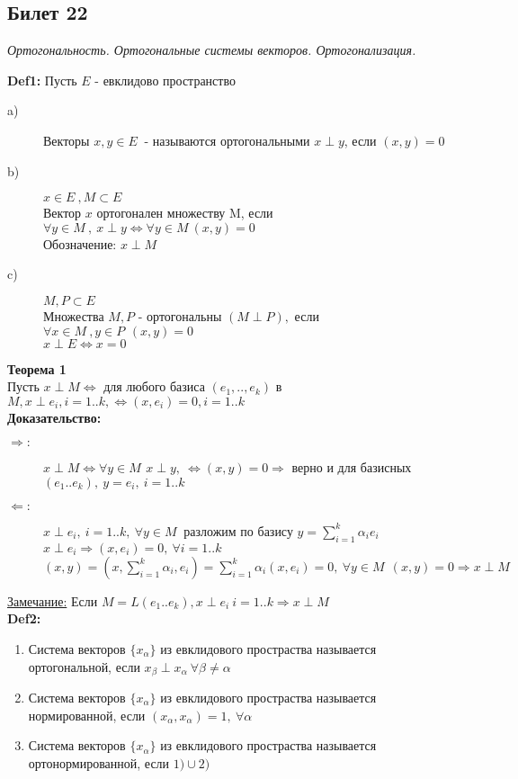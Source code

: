 \subsection{Билет 22}


\textit{Ортогональность. Ортогональные системы векторов. Ортогонализация.}


\textbf{Def1: } Пусть $E$ - евклидово пространство
\begin{description}
 \item [a)] Векторы $x,y \in E\ $ - называются ортогональными $x \perp y$, если $\left( x,y \right)=0$
 \item [b)] $x \in E\ , M \subset E$ \\
	Вектор $x$ ортогонален множеству M, если $\forall y \in M\ , \ x \perp y \Leftrightarrow \forall y \in M\ \left( x,y \right) = 0 $ \\
	Обозначение: $x \perp M$ 
 \item [c)] $M,P \subset E$ \\
	Множества $M,P$ - ортогональны $\left( M \perp P \right),$ если $\forall x \in M\ , y \in P\, \ \left( x,y \right)=0  $ \\
	$x \perp E \Leftrightarrow x=0 $
\end{description} 
\textbf{Теорема 1} \\
 Пусть $x \perp M \Leftrightarrow$ для любого базиса $(e_1,..,e_k)$ в $M,  x \perp e_i,  i=1..k,  \Leftrightarrow (x,e_i)=0, i=1..k $ \\
\textbf{Доказательство:} \\
\begin{description}
 \item [$\Rightarrow :$] $x \perp M \Leftrightarrow \forall y \in M\, \ x \perp y, \ \Leftrightarrow (x,y)=0 \Rightarrow$ верно и для базисных 
	$(e_1..e_k), \ y=e_i, \ i=1..k$
 \item [$\Leftarrow :$] $x \perp e_i, \ i=1..k, \ \forall y \in M\ $ разложим по базису $y = \sum \limits_{i=1}^k {\alpha_i e_i}$ \\
	$x \perp e_i \Rightarrow (x,e_i)=0, \ \forall i=1..k$ \\
	$(x,y)=(x,\sum \limits_{i=1}^k {\alpha_i,e_i}) = \sum \limits_{i=1}^k {\alpha_i (x,e_i) = 0, \ \forall y \in M\ \ (x,y)=0 \Rightarrow x \perp M } $
\end{description}
\underline{Замечание:} Если $M=L(e_1..e_k), x \perp e_i \ i=1..k \Rightarrow x \perp M $ \\
\textbf{Def2: } 
\begin{enumerate}
 \item Система векторов $\{x_{\alpha}\}$ из евклидового простраства называется ортогональной, если $x_{\beta} \perp x_{\alpha} \ \forall \beta \ne \alpha$
 \item Система векторов $\{x_{\alpha}\}$ из евклидового простраства называется нормированной, если $(x_{\alpha},x_{\alpha})=1, \ \forall \alpha$
 \item Система векторов $\{x_{\alpha}\}$ из евклидового простраства называется ортонормированной, если $1) \cup 2)$
\end{enumerate}
